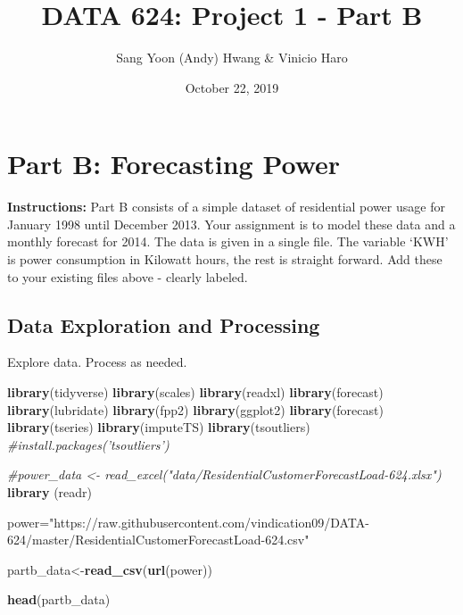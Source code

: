 \documentclass[openany]{book}
\title{DATA 624: Project 1 - Part B}
\author{Sang Yoon (Andy) Hwang \& Vinicio Haro}
\date{October 22, 2019}
\newenvironment{Shaded}{\begin{snugshade}}{\end{snugshade}}
\newcommand{\KeywordTok}[1]{\textcolor[rgb]{0.13,0.29,0.53}{\textbf{#1}}}
\newcommand{\StringTok}[1]{\textcolor[rgb]{0.31,0.60,0.02}{#1}}
\newcommand{\CommentTok}[1]{\textcolor[rgb]{0.56,0.35,0.01}{\textit{#1}}}
\newcommand{\NormalTok}[1]{#1}
\renewenvironment{quote}{\begin{myquote}}{\end{myquote}}
\begin{document}
\maketitle

{
\setcounter{tocdepth}{1}
\tableofcontents
}
\chapter*{Part B: Forecasting Power}\label{part-b}

\begin{quote}
\textbf{Instructions:} Part B consists of a simple dataset of
residential power usage for January 1998 until December 2013. Your
assignment is to model these data and a monthly forecast for 2014. The
data is given in a single file. The variable `KWH' is power consumption
in Kilowatt hours, the rest is straight forward. Add these to your
existing files above - clearly labeled.
\end{quote}

\section*{Data Exploration and Processing}\label{b-exploration}

Explore data. Process as needed.

\begin{Shaded}
\begin{Highlighting}[]
\KeywordTok{library}\NormalTok{(tidyverse)}
\KeywordTok{library}\NormalTok{(scales)}
\KeywordTok{library}\NormalTok{(readxl)}
\KeywordTok{library}\NormalTok{(forecast)}
\KeywordTok{library}\NormalTok{(lubridate)}
\KeywordTok{library}\NormalTok{(fpp2)}
\KeywordTok{library}\NormalTok{(ggplot2)}
\KeywordTok{library}\NormalTok{(forecast)}
\KeywordTok{library}\NormalTok{(tseries)}
\KeywordTok{library}\NormalTok{(imputeTS)}
\KeywordTok{library}\NormalTok{(tsoutliers)}
\CommentTok{#install.packages('tsoutliers')}
\end{Highlighting}
\end{Shaded}

\begin{Shaded}
\begin{Highlighting}[]
\CommentTok{#power_data <- read_excel("data/ResidentialCustomerForecastLoad-624.xlsx") }
\KeywordTok{library}\NormalTok{ (readr)}

\NormalTok{power=}\StringTok{"https://raw.githubusercontent.com/vindication09/DATA-624/master/ResidentialCustomerForecastLoad-624.csv"}

\NormalTok{partb_data<-}\KeywordTok{read_csv}\NormalTok{(}\KeywordTok{url}\NormalTok{(power))}

\KeywordTok{head}\NormalTok{(partb_data)}
\end{Highlighting}
\end{Shaded}
\end{document}
